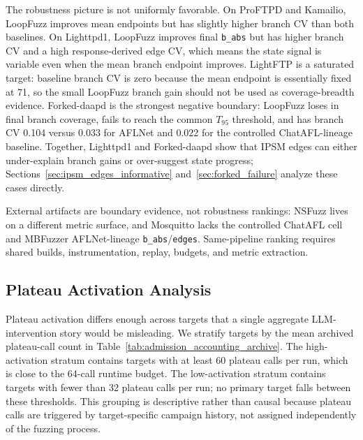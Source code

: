 \documentclass[final,5p,times,number]{elsarticle}
\begin{document}
The robustness picture is not uniformly favorable. On ProFTPD and Kamailio, LoopFuzz improves mean endpoints but has slightly higher branch CV than both baselines. On Lighttpd1, LoopFuzz improves final \texttt{b\_abs} but has higher branch CV and a high response-derived edge CV, which means the state signal is variable even when the mean branch endpoint improves. LightFTP is a saturated target: baseline branch CV is zero because the mean endpoint is essentially fixed at 71, so the small LoopFuzz branch gain should not be used as coverage-breadth evidence. Forked-daapd is the strongest negative boundary: LoopFuzz loses in final branch coverage, fails to reach the common $T_{95}$ threshold, and has branch CV 0.104 versus 0.033 for AFLNet and 0.022 for the controlled ChatAFL-lineage baseline. Together, Lighttpd1 and Forked-daapd show that IPSM edges can either under-explain branch gains or over-suggest state progress; Sections~\ref{sec:ipsm_edges_informative} and~\ref{sec:forked_failure} analyze these cases directly.

External artifacts are boundary evidence, not robustness rankings: NSFuzz lives on a different metric surface, and Mosquitto lacks the controlled ChatAFL cell and MBFuzzer AFLNet-lineage \texttt{b\_abs}/\texttt{edges}. Same-pipeline ranking requires shared builds, instrumentation, replay, budgets, and metric extraction.

\subsection{Plateau Activation Analysis}
\label{sec:plateau_activation_analysis}

Plateau activation differs enough across targets that a single aggregate LLM-intervention story would be misleading. We stratify targets by the mean archived plateau-call count in Table~\ref{tab:admission_accounting_archive}. The high-activation stratum contains targets with at least 60 plateau calls per run, which is close to the 64-call runtime budget. The low-activation stratum contains targets with fewer than 32 plateau calls per run; no primary target falls between these thresholds. This grouping is descriptive rather than causal because plateau calls are triggered by target-specific campaign history, not assigned independently of the fuzzing process.
\end{document}

